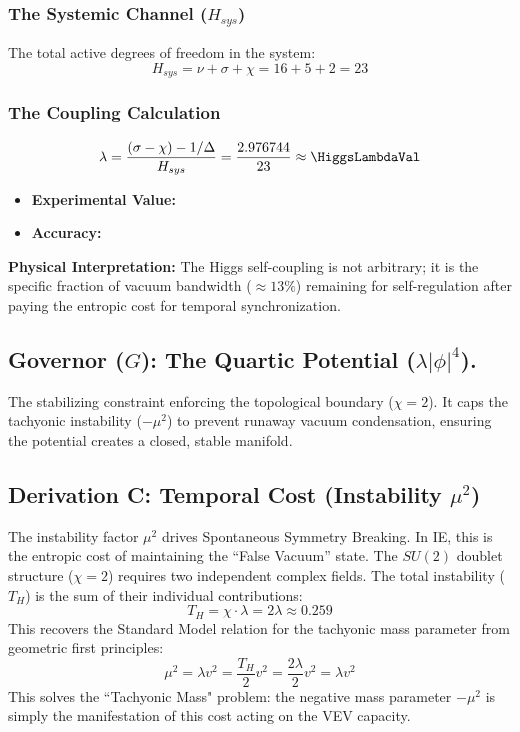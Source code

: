 \subsubsection{The Systemic Channel (\texorpdfstring{$H_{sys}$}{Hsys})}
The total active degrees of freedom in the system:
\begin{equation}
H_{sys} = \nu + \sigma + \chi = 16 + 5 + 2 = 23
\end{equation}

\subsubsection{The Coupling Calculation}
\begin{equation}
\lambda = \frac{(\sigma - \chi) - 1/\Delta}{H_{sys}} = \frac{2.976744}{23} \approx \mathbf{\HiggsLambdaVal}
\end{equation}
\begin{itemize}
    \item \textbf{Experimental Value:} \HiggsLambdaExperimentalValue
    \item \textbf{Accuracy:} \HiggsLambdaAccText
\end{itemize}

\textbf{Physical Interpretation:} The Higgs self-coupling is not arbitrary; it is the specific fraction of vacuum bandwidth ($\approx 13\%$) remaining for self-regulation after paying the entropic cost for temporal synchronization.

\subsection{Governor (\texorpdfstring{$G$}{G}): The Quartic Potential (\texorpdfstring{$\lambda|\phi|^4$}{lambdaphi4}).}
The stabilizing constraint enforcing the topological boundary ($\chi=2$). It caps the tachyonic instability ($-\mu^2$) to prevent runaway vacuum condensation, ensuring the potential creates a closed, stable manifold.


\subsection{Derivation C: Temporal Cost (Instability \texorpdfstring{$\mu^2$}{mu})}
The instability factor $\mu^2$ drives Spontaneous Symmetry Breaking. In IE, this is the entropic cost of maintaining the ``False Vacuum'' state. The $SU(2)$ doublet structure ($\chi=2$) requires two independent complex fields. The total instability ($T_H$) is the sum of their individual contributions:
\begin{equation}
T_H = \chi \cdot \lambda = 2\lambda \approx 0.259
\end{equation}
This recovers the Standard Model relation for the tachyonic mass parameter from geometric first principles:
\begin{equation}
\mu^2 = \lambda v^2 = \frac{T_H}{2} v^2 = \frac{2\lambda}{2} v^2 = \lambda v^2
\end{equation}
This solves the ``Tachyonic Mass" problem: the negative mass parameter $-\mu^2$ is simply the manifestation of this cost acting on the VEV capacity.

